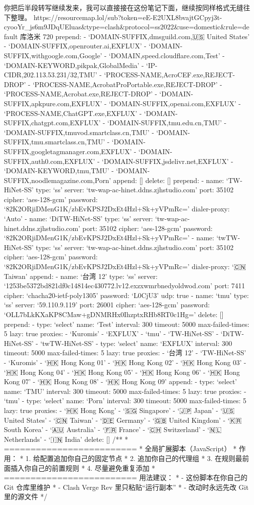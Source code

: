 \documentclass[
  chinese,
  9pt,
  a4paper,
]{ctexart}
\begin{document}
你把后半段转写继续发来，我可以直接接在这份笔记下面，继续按同样格式无缝往下整理。
https://resourcemap.lol/sub?token=eE-E2UXL8bvajtGCpyj3t-cyooYr\_js6m9JDqUEluas\&type=clash\&protocol=ss2022\&use=domestic\&rule=default
库洛米 720 prepend: - `DOMAIN-SUFFIX,dmsguild.com,🇺🇸 United States' -
`DOMAIN-SUFFIX,openrouter.ai,EXFLUX' -
`DOMAIN-SUFFIX,withgoogle.com,Google' -
`DOMAIN,speed.cloudflare.com,Test' - `DOMAIN-KEYWORD,pikpak,GlobalMedia'
- `IP-CIDR,202.113.53.231/32,TMU' -
`PROCESS-NAME,AcroCEF.exe,REJECT-DROP' -
`PROCESS-NAME,AcrobatProPortable.exe,REJECT-DROP' -
`PROCESS-NAME,Acrobat.exe,REJECT-DROP' -
`DOMAIN-SUFFIX,apkpure.com,EXFLUX' - `DOMAIN-SUFFIX,openai.com,EXFLUX' -
`PROCESS-NAME,ChatGPT.exe,EXFLUX' - `DOMAIN-SUFFIX,chatgpt.com,EXFLUX' -
`DOMAIN-SUFFIX,tmu.edu.cn,TMU' -
`DOMAIN-SUFFIX,tmuvod.smartclass.cn,TMU' -
`DOMAIN-SUFFIX,tmu.smartclass.cn,TMU' -
`DOMAIN-SUFFIX,googletagmanager.com,EXFLUX' -
`DOMAIN-SUFFIX,auth0.com,EXFLUX' - `DOMAIN-SUFFIX,jsdelivr.net,EXFLUX' -
`DOMAIN-KEYWORD,tmu,TMU' - `DOMAIN-SUFFIX,noodlemagazine.com,Porn'
append: {[}{]} delete: {[}{]} prepend: - name: `TW-HiNet-SS' type: `ss'
server: `tw-wap-ac-hinet.ddns.zjhstudio.com' port: 35102 cipher:
`aes-128-gcm' password: `82K2ORjiDMenG1K/zbEvKPSJ2DxEt4Hzl+Sk+yVPmRc='
dialer-proxy: `Auto' - name: `DiTW-HiNet-SS' type: `ss' server:
`tw-wap-ac-hinet.ddns.zjhstudio.com' port: 35102 cipher: `aes-128-gcm'
password: `82K2ORjiDMenG1K/zbEvKPSJ2DxEt4Hzl+Sk+yVPmRc=' - name:
`twTW-HiNet-SS' type: `ss' server: `tw-wap-ac-hinet.ddns.zjhstudio.com'
port: 35102 cipher: `aes-128-gcm' password:
`82K2ORjiDMenG1K/zbEvKPSJ2DxEt4Hzl+Sk+yVPmRc=' dialer-proxy: `🇨🇳 Taiwan'
append: - name: `台湾 12' type: `ss' server:
`1253be5372bd821df0c14814ec430772.lv12.exzxwmrbnedyoldwod.com' port:
7411 cipher: `chacha20-ietf-poly1305' password: `L0CjU3' udp: true -
name: `tmu' type: `ss' server: `59.110.9.119' port: 26001 cipher:
`aes-128-gcm' password: `OLL7bLkKXaKP8CMaw+gDNMRHx0IhzptxRHb8RT0c1Hg='
delete: {[}{]} prepend: - type: `select' name: `Test' interval: 300
timeout: 5000 max-failed-times: 5 lazy: true proxies: - `Kuromis' -
`EXFLUX' - `tmu' - `TW-HiNet-SS' - `DiTW-HiNet-SS' - `twTW-HiNet-SS' -
type: `select' name: `EXFLUX' interval: 300 timeout: 5000
max-failed-times: 5 lazy: true proxies: - `台湾 12' - `TW-HiNet-SS' -
`Kuromis' - `🇭🇰 Hong Kong 01' - `🇭🇰 Hong Kong 02' - `🇭🇰 Hong Kong 03' -
`🇭🇰 Hong Kong 04' - `🇭🇰 Hong Kong 05' - `🇭🇰 Hong Kong 06' - `🇭🇰 Hong
Kong 07' - `🇭🇰 Hong Kong 08' - `🇭🇰 Hong Kong 09' append: - type:
`select' name: `TMU' interval: 300 timeout: 5000 max-failed-times: 5
lazy: true proxies: - `tmu' - type: `select' name: `Porn' interval: 300
timeout: 5000 max-failed-times: 5 lazy: true proxies: - `🇭🇰 Hong Kong' -
`🇸🇬 Singapore' - `🇯🇵 Japan' - `🇺🇸 United States' - `🇨🇳 Taiwan' - `🇩🇪
Germany' - `🇬🇧 United Kingdom' - `🇰🇷 South Korea' - `🇦🇺 Australia' - `🇫🇷
France' - `🇨🇭 Switzerland' - `🇳🇱 Netherlands' - `🇮🇳 India' delete:
{[}{]} /** * ========================= * 全局扩展脚本（JavaScript） *
作用： * 1. 给配置追加你自己的固定节点 * 2. 追加你自己的代理组 * 3.
在规则最前面插入你自己的前置规则 * 4. 尽量避免重复添加 *
========================= \emph{ } 用法建议： * - 这份脚本在你自己的 Git
仓库里维护 * - Clash Verge Rev 里只粘贴``运行副本'' * - 改动时永远先改
Git 里的源文件 */
\end{document}
